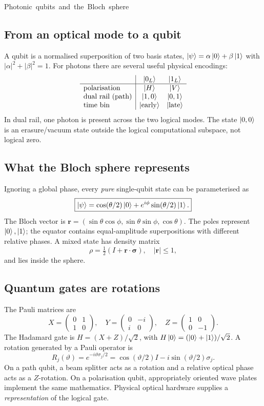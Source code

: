 \unit{Photonic qubits and the Bloch sphere}
\subsection{From an optical mode to a qubit}
A qubit is a normalised superposition of two
basis states, \(\left\lvert \psi\right\rangle=\alpha\left\lvert 0\right\rangle+\beta\left\lvert 1\right\rangle\)
with \(|\alpha|^2+|\beta|^2=1\).
For photons there are several useful
physical encodings:
\[
\begin{array}{l|cc}
&\left\lvert 0_L\right\rangle&\left\lvert 1_L\right\rangle\\\hline
\text{polarisation}&\left\lvert H\right\rangle&\left\lvert V\right\rangle\\
\text{dual rail (path)}&\left\lvert 1,0\right\rangle&\left\lvert 0,1\right\rangle\\
\text{time bin}&\left\lvert \rm early\right\rangle&\left\lvert \rm late\right\rangle
\end{array}
\]
In dual rail, one photon is present across
the two logical modes. The state \(\left\lvert 0,0\right\rangle\)
is an erasure/vacuum state outside the
logical computational subspace, not logical zero.

\subsection{What the Bloch sphere represents}
Ignoring a global phase, every \emph{pure}
single-qubit state can be parameterised as
\[
\boxed{\left\lvert \psi\right\rangle=\cos(\theta/2)\left\lvert 0\right\rangle+
e^{i\phi}\sin(\theta/2)\left\lvert 1\right\rangle.}
\]
The Bloch vector is
\(\mathbf r=(\sin\theta\cos\phi,
\sin\theta\sin\phi,\cos\theta)\).
The poles represent \(\left\lvert 0\right\rangle,\left\lvert 1\right\rangle\);
the equator contains equal-amplitude
superpositions with different relative phases.
A mixed state has density matrix
\[
\rho=\tfrac12(I+\mathbf r\cdot\boldsymbol\sigma),
\quad |\mathbf r|\le1,
\]
and lies inside the sphere.

\subsection{Quantum gates are rotations}
The Pauli matrices are
\[
X=\begin{pmatrix}0&1\\1&0\end{pmatrix},\quad
Y=\begin{pmatrix}0&-i\\i&0\end{pmatrix},\quad
Z=\begin{pmatrix}1&0\\0&-1\end{pmatrix}.
\]
The Hadamard gate is
\(H=(X+Z)/\sqrt2\), with
\(H\left\lvert 0\right\rangle=(\left\lvert 0\right\rangle+\left\lvert 1\right\rangle)/\sqrt2\).
A rotation generated by a Pauli operator is
\[
R_j(\vartheta)=e^{-i\vartheta\sigma_j/2}
=\cos(\vartheta/2)I-
i\sin(\vartheta/2)\sigma_j.
\]
On a path qubit, a beam splitter acts as
a rotation and a relative optical phase
acts as a \(Z\)-rotation. On a
polarisation qubit, appropriately oriented
wave plates implement the same mathematics.
Physical optical hardware supplies a
\emph{representation} of the logical gate.

